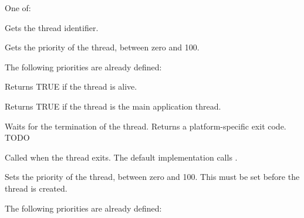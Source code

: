 
One of:

\twocolwidtha{7cm}
\begin{twocollist}\itemsep=0pt
\end{twocollist}

\label{wxthreadgetid}


Gets the thread identifier.

\label{wxthreadgetpriority}


Gets the priority of the thread, between zero and 100.

The following priorities are already defined:

\twocolwidtha{7cm}
\begin{twocollist}\itemsep=0pt
\end{twocollist}

\label{wxthreadisalive}


Returns TRUE if the thread is alive.

\label{wxthreadismain}


Returns TRUE if the thread is the main application thread.

\label{wxthreadjoin}


Waits for the termination of the thread. Returns a platform-specific exit code. TODO

\label{wxthreadonexit}


Called when the thread exits. The default implementation calls .

\label{wxthreadsetpriority}


Sets the priority of the thread, between zero and 100. This must be set before the thread is created.

The following priorities are already defined:

\twocolwidtha{7cm}
\begin{twocollist}\itemsep=0pt
\end{twocollist}

